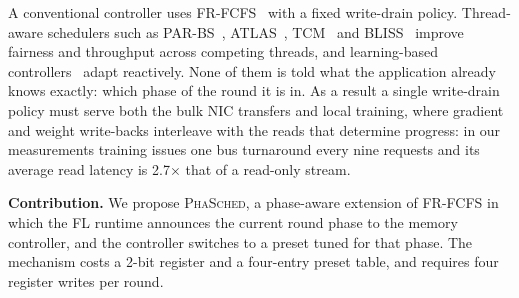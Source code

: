 \documentclass[conference]{IEEEtran}
\newcommand{\name}{\textsc{PhaSched}}
\begin{document}
A conventional controller uses FR-FCFS~\cite{frfcfs} with a fixed write-drain policy. Thread-aware schedulers such as PAR-BS~\cite{parbs}, ATLAS~\cite{atlas}, TCM~\cite{tcm} and BLISS~\cite{bliss} improve fairness and throughput across competing threads, and learning-based controllers~\cite{rlsched} adapt reactively. None of them is told what the application already knows exactly: which phase of the round it is in. As a result a single write-drain policy must serve both the bulk NIC transfers and local training, where gradient and weight write-backs interleave with the reads that determine progress: in our measurements training issues one bus turnaround every nine requests and its average read latency is 2.7$\times$ that of a read-only stream.

\textbf{Contribution.} We propose \name{}, a phase-aware extension of FR-FCFS in which the FL runtime announces the current round phase to the memory controller, and the controller switches to a preset tuned for that phase. The mechanism costs a 2-bit register and a four-entry preset table, and requires four register writes per round.
\end{document}
